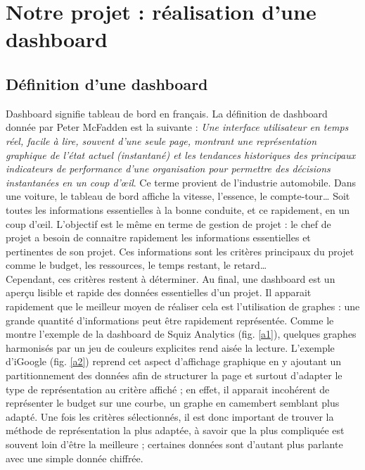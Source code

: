 \documentclass[12pt]{report}
\begin{document}
\chapter{Notre projet : réalisation d'une dashboard}
  
  \section{Définition d'une dashboard}
  
Dashboard signifie tableau de bord en français. La définition de dashboard donnée par Peter McFadden est la suivante : \emph{Une interface utilisateur en temps réel, facile à lire, souvent d’une seule page, montrant une représentation graphique de l'état actuel (instantané) et les tendances historiques des principaux indicateurs de performance d'une organisation pour permettre des décisions instantanées en un coup d'œil}. Ce terme provient de l’industrie automobile. Dans une voiture, le tableau de bord affiche la vitesse, l’essence, le compte-tour… Soit toutes les informations essentielles à la bonne conduite, et ce rapidement, en un coup d’œil. L’objectif est le même en terme de gestion de projet : le chef de projet a besoin de connaitre rapidement les informations essentielles et pertinentes de son projet. Ces informations sont les critères principaux du projet comme le budget, les ressources, le temps restant, le retard… \\

Cependant, ces critères restent à déterminer. Au final, une dashboard est un aperçu lisible et rapide des données essentielles d’un projet. Il apparait rapidement que le meilleur moyen de réaliser cela est l’utilisation de graphes : une grande quantité d’informations peut être rapidement représentée. Comme le montre l’exemple de la dashboard de Squiz Analytics (fig. \ref{a1}), quelques graphes harmonisés par un jeu de couleurs explicites rend aisée la lecture. L’exemple d’iGoogle (fig. \ref{a2}) reprend cet aspect d’affichage graphique en y ajoutant un partitionnement des données afin de structurer la page et surtout d’adapter le type de représentation au critère affiché ; en effet, il apparait incohérent de représenter le budget sur une courbe, un graphe en camembert semblant plus adapté. Une fois les critères sélectionnés, il est donc important de trouver la méthode de représentation la plus adaptée, à savoir que la plus compliquée est souvent loin d’être la meilleure ; certaines données sont d’autant plus parlante avec une simple donnée chiffrée.
  
\end{document}
